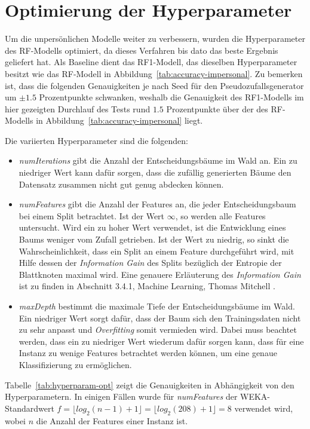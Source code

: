 \section{Optimierung der Hyperparameter}
Um die unpersönlichen Modelle weiter zu verbessern, wurden die Hyperparameter des \acs{RF}-Modells optimiert, da dieses Verfahren bis dato das beste Ergebnis geliefert hat. Als Baseline dient das RF1-Modell, das dieselben Hyperparameter besitzt wie das \acs{RF}-Modell in Abbildung~\ref{tab:accuracy-impersonal}. Zu bemerken ist, dass die folgenden Genauigkeiten je nach Seed für den Pseudozufallsgenerator um $\pm 1.5$ Prozentpunkte schwanken, weshalb die Genauigkeit des RF1-Modells im hier gezeigten Durchlauf des Tests rund $1.5$ Prozentpunkte über der des \acs{RF}-Modells in Abbildung~\ref{tab:accuracy-impersonal} liegt.

Die variierten Hyperparameter sind die folgenden:

\begin{itemize}
	\item \textit{numIterations} gibt die Anzahl der Entscheidungsbäume im Wald an. Ein zu niedriger Wert kann dafür sorgen, dass die zufällig generierten Bäume den Datensatz zusammen nicht gut genug abdecken können.
	\item \textit{numFeatures} gibt die Anzahl der Features an, die jeder Entscheidungsbaum bei einem Split betrachtet. Ist der Wert $\infty$, so werden alle Features untersucht. Wird ein zu hoher Wert verwendet, ist die Entwicklung eines Baums weniger vom Zufall getrieben. Ist der Wert zu niedrig, so sinkt die Wahrscheinlichkeit, dass ein Split an einem Feature durchgeführt wird, mit Hilfe dessen der \textit{Information Gain} des Splits bezüglich der Entropie der Blattknoten maximal wird. Eine genauere Erläuterung des \textit{Information Gain} ist zu finden in Abschnitt 3.4.1, Machine Learning, Thomas Mitchell \cite{Mitchell1997}.
	\item \textit{maxDepth} bestimmt die maximale Tiefe der Entscheidungsbäume im Wald. Ein niedriger Wert sorgt dafür, dass der Baum sich den Trainingsdaten nicht zu sehr anpasst und \textit{Overfitting} somit vermieden wird. Dabei muss beachtet werden, dass ein zu niedriger Wert wiederum dafür sorgen kann, dass für eine Instanz zu wenige Features betrachtet werden können, um eine genaue Klassifizierung zu ermöglichen.
\end{itemize}

Tabelle~\ref{tab:hyperparam-opt} zeigt die Genauigkeiten in Abhängigkeit von den Hyperparametern. In einigen Fällen wurde für \textit{numFeatures} der WEKA-Standardwert $f = \lfloor log_2(n - 1) + 1 \rfloor = \lfloor log_2(208) + 1 \rfloor = 8$ verwendet wird, wobei $n$ die Anzahl der Features einer Instanz ist.


